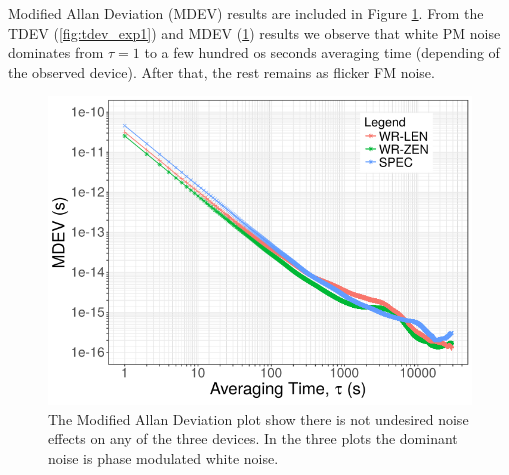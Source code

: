 Modified Allan Deviation (MDEV) results are included in Figure 
\ref{fig:mdev_exp1}. From the TDEV (\ref{fig:tdev_exp1}) and MDEV (\ref{fig:mdev_exp1}) results we observe that white PM noise dominates from $\tau=1$ to a few hundred os seconds averaging time (depending of the observed device). After that, the rest remains as flicker FM noise.

\begin{figure}
    \centering
    \includegraphics[width=0.7\linewidth]{img/mdev_exp1}
    \caption[MDEV for the WR devices comparison.]{The Modified Allan Deviation 
        plot show there is not undesired noise effects on any of the three 
        devices. 
        In the three plots the dominant noise is phase modulated white noise.}
    \label{fig:mdev_exp1}
\end{figure}


